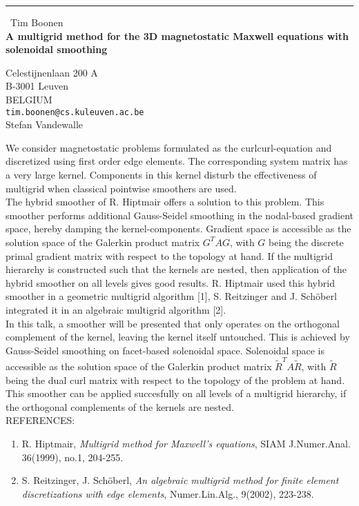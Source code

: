 \documentclass{report}
\begin{document}
\begin{center}
\rule{6in}{1pt} \
{\large Tim Boonen \\
{\bf A multigrid method for the 3D magnetostatic Maxwell equations with solenoidal smoothing}}

Celestijnenlaan 200 A \\ B-3001 Leuven \\ BELGIUM
\\
{\tt tim.boonen@cs.kuleuven.ac.be}\\
Stefan Vandewalle\end{center}

We consider magnetostatic problems formulated as the curlcurl-equation
and discretized using first order edge elements. The corresponding system
matrix has a very large kernel.
Components in this kernel disturb the effectiveness of multigrid when
classical pointwise smoothers are used.
\\
The hybrid smoother of R. Hiptmair offers a solution to this problem.
This smoother performs additional Gauss-Seidel smoothing in the
nodal-based gradient space, hereby damping the kernel-components.
Gradient space is accessible as the solution
space of the Galerkin product matrix $G^TAG$, with $G$ being the discrete
primal gradient matrix with respect to the topology at hand. If the
multigrid hierarchy is constructed such that the kernels are nested, then
application of the hybrid smoother on all levels gives good results. R.
Hiptmair used this hybrid smoother in a geometric multigrid algorithm
[1], S. Reitzinger and J. Sch\"oberl integrated it in an algebraic
multigrid algorithm [2].
\\
In this talk, a smoother will be presented that only operates on the
orthogonal complement of the kernel, leaving the kernel itself untouched.
This is achieved by Gauss-Seidel smoothing on facet-based solenoidal
space. Solenoidal space is accessible as the solution space of the
Galerkin product matrix $\tilde{R}^T A \tilde{R}$, with $\tilde{R}$ being
the dual curl matrix with respect to the topology of the problem at hand.
This smoother can be applied succesfully on all levels of a multigrid
hierarchy, if the orthogonal complements of the kernels are nested.
\vspace*{5mm}
\\
REFERENCES:
\begin{enumerate}
\item R. Hiptmair, \emph{Multigrid method for Maxwell's equations}, SIAM
J.Numer.Anal. 36(1999), no.1,
204-255.
\item S. Reitzinger, J. Sch\"oberl, \emph{An algebraic multigrid method
for finite element discretizations
with edge elements}, Numer.Lin.Alg., 9(2002), 223-238.
\end{enumerate}
\end{document}
